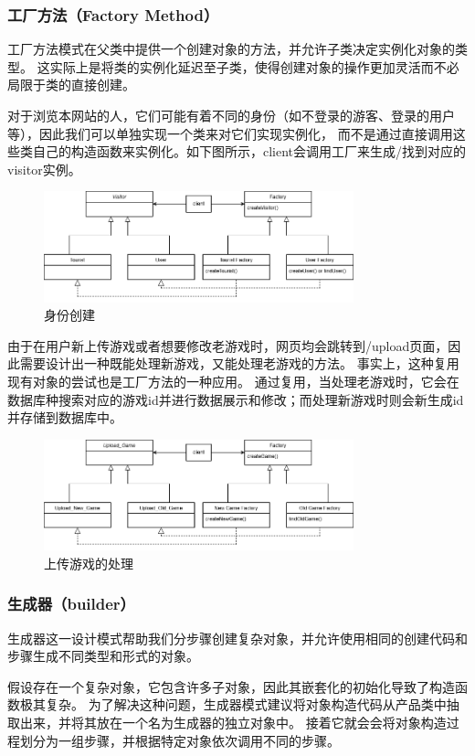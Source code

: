 \documentclass[12pt]{ctexart} %
\begin{document}
\subsubsection{工厂方法（Factory Method）} 
工厂方法模式在父类中提供一个创建对象的方法，并允许子类决定实例化对象的类型。
这实际上是将类的实例化延迟至子类，使得创建对象的操作更加灵活而不必局限于类的直接创建。

对于浏览本网站的人，它们可能有着不同的身份（如不登录的游客、登录的用户等），因此我们可以单独实现一个类来对它们实现实例化，
而不是通过直接调用这些类自己的构造函数来实例化。如下图所示，client会调用工厂来生成/找到对应的visitor实例。
\begin{figure}[H]
  \centering
  \includegraphics[width=0.8\textwidth]{factory_1.png}
  \caption{身份创建}
\end{figure}

由于在用户新上传游戏或者想要修改老游戏时，网页均会跳转到/upload页面，因此需要设计出一种既能处理新游戏，又能处理老游戏的方法。
事实上，这种复用现有对象的尝试也是工厂方法的一种应用。
通过复用，当处理老游戏时，它会在数据库种搜索对应的游戏id并进行数据展示和修改；而处理新游戏时则会新生成id并存储到数据库中。
\begin{figure}[H]
  \centering
  \includegraphics[width=0.8\textwidth]{factory_2.png}
  \caption{上传游戏的处理}
\end{figure}

\subsubsection{生成器（builder）} 
生成器这一设计模式帮助我们分步骤创建复杂对象，并允许使用相同的创建代码和步骤生成不同类型和形式的对象。

假设存在一个复杂对象，它包含许多子对象，因此其嵌套化的初始化导致了构造函数极其复杂。
为了解决这种问题，生成器模式建议将对象构造代码从产品类中抽取出来，并将其放在一个名为生成器的独立对象中。
接着它就会会将对象构造过程划分为一组步骤，并根据特定对象依次调用不同的步骤。
\end{document}

